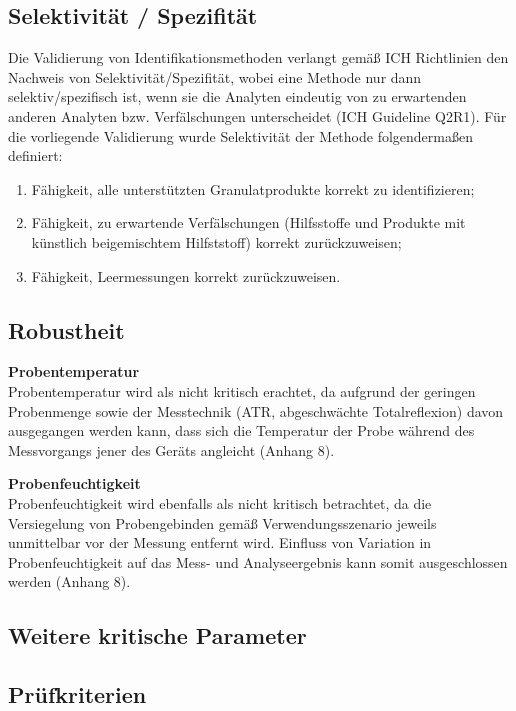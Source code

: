\documentclass[11pt, a4paper]{article}
\begin{document}
\subsection{Selektivität / Spezifität}
Die Validierung von Identifikationsmethoden verlangt gemäß ICH Richtlinien den Nachweis von Selektivität/Spezifität, wobei eine Methode nur dann selektiv/spezifisch ist, wenn sie die Analyten eindeutig von zu erwartenden anderen Analyten bzw. Verfälschungen unterscheidet (ICH Guideline Q2R1). Für die vorliegende Validierung wurde Selektivität der Methode folgendermaßen definiert:
\begin{enumerate}
\item 	Fähigkeit, alle unterstützten Granulatprodukte korrekt zu identifizieren;
\item 	Fähigkeit, zu erwartende Verfälschungen (Hilfsstoffe und Produkte mit künstlich beigemischtem Hilfststoff) korrekt zurückzuweisen;
\item	Fähigkeit, Leermessungen korrekt zurückzuweisen.
\end{enumerate}

\subsection{Robustheit}
\textbf{Probentemperatur}\\[1.2pt]
Probentemperatur wird als nicht kritisch erachtet, da aufgrund der geringen Probenmenge sowie der Messtechnik (ATR, abgeschwächte Totalreflexion) davon ausgegangen werden kann, dass sich die Temperatur der Probe während des Messvorgangs jener des Geräts angleicht (Anhang 8).

\textbf{Probenfeuchtigkeit}\\[1.2pt]
Probenfeuchtigkeit wird ebenfalls als nicht kritisch betrachtet, da die Versiegelung von Probengebinden gemäß Verwendungsszenario jeweils unmittelbar vor der Messung entfernt wird. Einfluss von Variation in Probenfeuchtigkeit auf das Mess- und Analyseergebnis kann somit ausgeschlossen werden (Anhang 8).


\subsection{Weitere kritische Parameter}

\subsection{Prüfkriterien}
\end{document}
